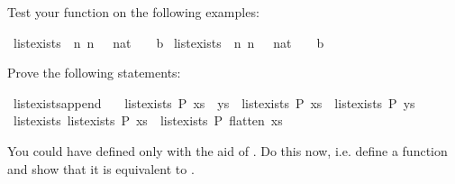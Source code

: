 \begin{isabellebody}
\begin{isamarkuptext}
Test your function on the following examples:%
\end{isamarkuptext}%
\isamarkuptrue%
\ {\isachardoublequote}list{\isacharunderscore}exists\ {\isacharparenleft}{\isasymlambda}\ n{\isachardot}\ n\ {\isacharless}\ {}{\isacharparenright}\ {\isacharbrackleft}{}{\isacharcolon}{\isacharcolon}nat{\isacharcomma}\ {}{\isacharcomma}\ {}{\isacharbrackright}\ {\isacharequal}\ b{\isachardoublequote}\isamarkupfalse%
\isanewline
\isamarkupfalse%
\ {\isachardoublequote}list{\isacharunderscore}exists\ {\isacharparenleft}{\isasymlambda}\ n{\isachardot}\ n\ {\isacharless}\ {}{\isacharparenright}\ {\isacharbrackleft}{}{\isacharcolon}{\isacharcolon}nat{\isacharcomma}\ {}{\isacharcomma}\ {}{\isacharbrackright}\ {\isacharequal}\ b{\isachardoublequote}\isamarkupfalse%
\isamarkupfalse%
%
\begin{isamarkuptext}%
Prove the following statements:%
\end{isamarkuptext}%
\isamarkuptrue%
\ list{\isacharunderscore}exists{\isacharunderscore}append{\isacharcolon}\ \isanewline
\ \ {\isachardoublequote}list{\isacharunderscore}exists\ P\ {\isacharparenleft}xs\ {\isacharat}\ ys{\isacharparenright}\ {\isacharequal}\ {\isacharparenleft}list{\isacharunderscore}exists\ P\ xs\ {\isasymor}\ list{\isacharunderscore}exists\ P\ ys{\isacharparenright}{\isachardoublequote}\isamarkupfalse%
\isanewline
\isamarkupfalse%
\ {\isachardoublequote}list{\isacharunderscore}exists\ {\isacharparenleft}list{\isacharunderscore}exists\ P{\isacharparenright}\ xs\ {\isacharequal}\ list{\isacharunderscore}exists\ P\ {\isacharparenleft}flatten\ xs{\isacharparenright}{\isachardoublequote}\isamarkupfalse%
\isamarkupfalse%
%
\begin{isamarkuptext}%
You could have defined  only with the aid of
. Do this now, i.e. define a function  and show that it is equivalent to .%
\end{isamarkuptext}%
\isamarkuptrue%
\isanewline
\isamarkupfalse%
\end{isabellebody}%
